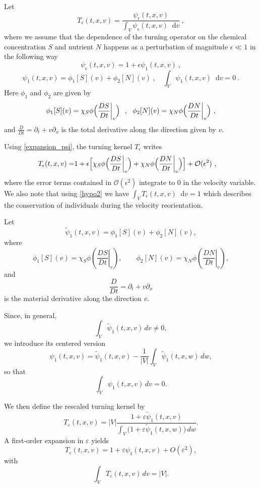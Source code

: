 \documentclass[11pt,twoside]{article}
\newcommand*\diff{\mathop{}\!\mathrm{d}}
\theoremstyle{plain}
\theoremstyle{nonumberplain}
\begin{document}
Let 
\begin{equation}\label{TepsFeps}
    T_\epsilon(t,x,v)=\frac{\psi_\epsilon(t,x,{v}) }{\displaystyle\int_{V}\psi_\epsilon(t,x,{v})  \diff {v}}\ ,
\end{equation}
where we assume that the dependence of the turning operator on the chemical concentration $S$ and nutrient $N$ happens as a perturbation of magnitude $\epsilon\ll 1$ in the following way
\begin{equation}\label{expansion_psi}
    \psi_\epsilon(t,x,{v})=1+\epsilon\psi_1(t,x,{v})\ ,
\end{equation}
\begin{equation}
\psi_1(t,x,{v}) = \phi_1[S]({v}) + \phi_2[N]({v})\ , \quad\int_V\psi_1(t,x,{v})\diff {v}=0 \ . \label{hypo2}
\end{equation}
Here $\phi_1$ and $\phi_2$ are given by
$$\phi_1[S]({v})=\chi_S\phi\Bigl(\frac{DS}{Dt}\bigg\rvert_{v}\Bigr)\ \ ,\ \ \phi_2[N](v)= \chi_N\phi\Bigl(\frac{DN}{Dt}\bigg\rvert_{v}\Bigr)\ ,$$
and $\frac{D}{Dt}=\partial_t+{v}\partial_x$ is the total derivative along the direction given by ${v}$.

Using \eqref{expansion_psi}, the turning kernel $T_\epsilon$ writes
\begin{align}
    T_\epsilon(t,x,{v})=& 1+\epsilon\Bigl[\chi_S\phi\Bigl(\frac{DS}{Dt}\bigg\rvert_{v}\Bigr)+ \chi_N\phi\Bigl(\frac{DN}{Dt}\bigg\rvert_{v}\Bigr)\Bigr]  + {\mathcal{O}(\epsilon^2)} \ ,\label{eq: turning operator scaled}
\end{align}
{where the error terms contained in $\mathcal{O}(\epsilon^2)$ integrate to $0$ in the velocity variable. We also note that using \eqref{hypo2} we have $\int_V T_\epsilon(t,x,v)\diff v=1$ which describes the conservation of individuals during the velocity reorientation.}

{\color{red} 
Let
\[
\widetilde{\psi}_1(t,x,v)=\phi_1[S](v)+\phi_2[N](v),
\]
where
\[
\phi_1[S](v)=\chi_S\phi\!\left(\left.\frac{DS}{Dt}\right|_v\right),
\qquad
\phi_2[N](v)=\chi_N\phi\!\left(\left.\frac{DN}{Dt}\right|_v\right),
\]
and
\[
\frac{D}{Dt}=\partial_t+v\partial_x
\]
is the material derivative along the direction \(v\).

Since, in general,
\[
\int_V \widetilde{\psi}_1(t,x,v)\,dv \neq 0,
\]
we introduce its centered version
\[
\psi_1(t,x,v)
=
\widetilde{\psi}_1(t,x,v)
-
\frac1{|V|}\int_V \widetilde{\psi}_1(t,x,w)\,dw,
\]
so that
\[
\int_V \psi_1(t,x,v)\,dv = 0.
\]

We then define the rescaled turning kernel by
\[
T_\varepsilon(t,x,v)
=
|V|
\frac{1+\varepsilon \widetilde{\psi}_1(t,x,v)}
{\displaystyle \int_V \bigl(1+\varepsilon \widetilde{\psi}_1(t,x,w)\bigr)\,dw }.
\]
A first-order expansion in \(\varepsilon\) yields
\[
T_\varepsilon(t,x,v)=1+\varepsilon \psi_1(t,x,v)+O(\varepsilon^2),
\]
with
\[
\int_V T_\varepsilon(t,x,v)\,dv = |V|.
\]
}
\end{document}

